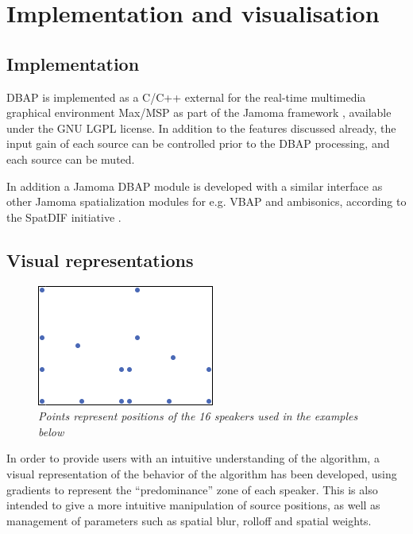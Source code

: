 \documentclass[twoside,10pt]{article}
\begin{document}
%
%


\section{Implementation and visualisation}

\subsection{Implementation}

DBAP is implemented as a C/C++ external for the real-time multimedia graphical environment Max/MSP \cite{Puckette:1988patcher, Zicarelli:1998} as part of the Jamoma framework \cite{Place:2006jamoma}, available under the GNU LGPL license. In addition to the features discussed already, the input gain of each source can be controlled prior to the DBAP processing, and each source can be muted.

In addition a Jamoma DBAP module is developed with a similar interface as other Jamoma spatialization modules for e.g. VBAP and ambisonics, according to the SpatDIF initiative \cite{Peters:2008spatdif}.



\subsection{Visual representations}
\label{sec:visual_representation}

\begin{figure}[ht]
\centerline{\includegraphics[scale=0.8]{LoudspeakerPositions}}
\caption{{\it Points represent positions of the 16 speakers used in the examples below}}
\label{speaker_positions}
\end{figure}

In order to provide users with an intuitive understanding of the algorithm, a visual representation of the behavior of the algorithm has been developed, using gradients to represent the ``predominance'' zone of each speaker. This is also intended to give a more intuitive manipulation of source positions, as well as management of parameters such as spatial blur, rolloff and spatial weights.
\end{document}
